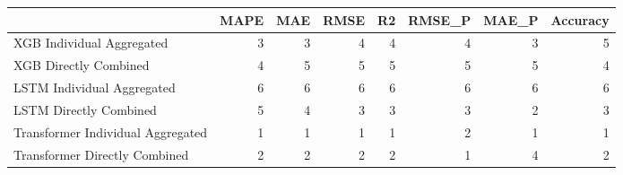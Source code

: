 \begin{tabular}{lrrrrrrr}
\toprule
{} &  MAPE &  MAE &  RMSE &  R2 &  RMSE\_P &  MAE\_P &  Accuracy \\
\midrule
XGB Individual Aggregated         &     3 &    3 &     4 &   4 &       4 &      3 &         5 \\
XGB Directly Combined             &     4 &    5 &     5 &   5 &       5 &      5 &         4 \\
LSTM Individual Aggregated        &     6 &    6 &     6 &   6 &       6 &      6 &         6 \\
LSTM Directly Combined            &     5 &    4 &     3 &   3 &       3 &      2 &         3 \\
Transformer Individual Aggregated &     1 &    1 &     1 &   1 &       2 &      1 &         1 \\
Transformer Directly Combined     &     2 &    2 &     2 &   2 &       1 &      4 &         2 \\
\bottomrule
\end{tabular}
